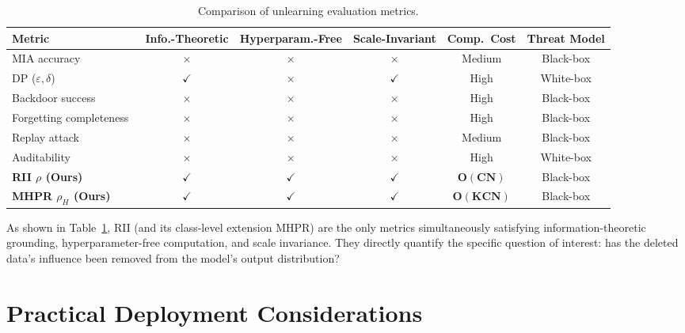 \documentclass[journal]{IEEEtran}
\theoremstyle{definition}
\begin{document}
\begin{table}[t]
\centering
\caption{Comparison of unlearning evaluation metrics.}\label{tab:metric_compare}
\setlength{\tabcolsep}{5pt}
\begin{tabular}{l c c c c c}
\toprule
\textbf{Metric} & \textbf{Info.-Theoretic} & \textbf{Hyperparam.-Free} & \textbf{Scale-Invariant} & \textbf{Comp.\ Cost} & \textbf{Threat Model} \\
\midrule
MIA accuracy~\cite{shokri2017membership} & $\times$ & $\times$ & $\times$ & Medium & Black-box \\
DP ($\varepsilon,\delta$)~\cite{guo2020certified} & $\checkmark$ & $\times$ & $\checkmark$ & High & White-box \\
Backdoor success~\cite{sommer2022towards} & $\times$ & $\times$ & $\times$ & High & Black-box \\
Forgetting completeness~\cite{goel2024corrective} & $\times$ & $\times$ & $\times$ & High & Black-box \\
Replay attack~\cite{chen2021when} & $\times$ & $\times$ & $\times$ & Medium & Black-box \\
Auditability~\cite{thudi2022necessity} & $\times$ & $\times$ & $\times$ & High & White-box \\
\hline
\textbf{RII $\rho$ (Ours)} & $\mathbf{\checkmark}$ & $\mathbf{\checkmark}$ & $\mathbf{\checkmark}$ & $\mathbf{O(CN)}$ & Black-box \\
\textbf{MHPR $\rho_H$ (Ours)} & $\mathbf{\checkmark}$ & $\mathbf{\checkmark}$ & $\mathbf{\checkmark}$ & $\mathbf{O(KCN)}$ & Black-box \\
\bottomrule
\end{tabular}
\end{table}

As shown in Table~\ref{tab:metric_compare}, RII (and its class-level extension MHPR) are the only metrics simultaneously satisfying information-theoretic grounding, hyperparameter-free computation, and scale invariance. They directly quantify the specific question of interest: has the deleted data's influence been removed from the model's output distribution?

\section{Practical Deployment Considerations}
\label{sec:deployment}
\end{document}
